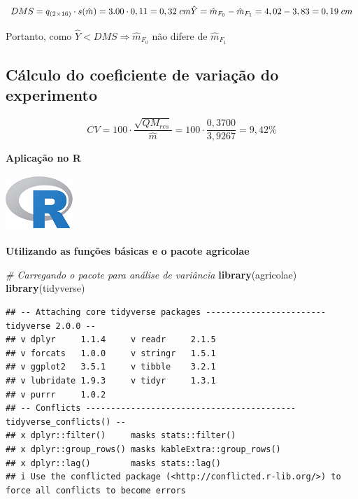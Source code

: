 \documentclass[
]{article}
\newenvironment{Shaded}{\begin{snugshade}}{\end{snugshade}}
\newcommand{\CommentTok}[1]{\textcolor[rgb]{0.56,0.35,0.01}{\textit{#1}}}
\newcommand{\FunctionTok}[1]{\textcolor[rgb]{0.13,0.29,0.53}{\textbf{#1}}}
\newcommand{\NormalTok}[1]{#1}
\begin{document}
\[
DMS=q_{(2\times1 6)}\cdot s(\hat{m})=3.00 \cdot 0,11 = 0,32\; cm \\
\hat{Y}=\hat{m}_{F_0}-\hat{m}_{F_1}=4,02-3,83=0,19 \; cm
\]

Portanto, como \(\hat{Y}< DMS \Rightarrow \hat{m}_{F_0}\) não difere de
\(\hat{m}_{F_1}\)

\subsection{Cálculo do coeficiente de variação do
experimento}\label{cuxe1lculo-do-coeficiente-de-variauxe7uxe3o-do-experimento}

\[
CV=100\cdot \frac{\sqrt{QM_{res}}}{\hat{m}}=100\cdot \frac{0,3700}{3,9267}=9,42\%
\]

\textbf{Aplicação no R}

\includegraphics{R.png}

\textbf{Utilizando as funções básicas e o pacote agricolae}

\begin{Shaded}
\begin{Highlighting}[]
\CommentTok{\# Carregando o pacote para análise de variância}
\FunctionTok{library}\NormalTok{(agricolae)}
\FunctionTok{library}\NormalTok{(tidyverse)}
\end{Highlighting}
\end{Shaded}

\begin{verbatim}
## -- Attaching core tidyverse packages ------------------------ tidyverse 2.0.0 --
## v dplyr     1.1.4     v readr     2.1.5
## v forcats   1.0.0     v stringr   1.5.1
## v ggplot2   3.5.1     v tibble    3.2.1
## v lubridate 1.9.3     v tidyr     1.3.1
## v purrr     1.0.2     
## -- Conflicts ------------------------------------------ tidyverse_conflicts() --
## x dplyr::filter()     masks stats::filter()
## x dplyr::group_rows() masks kableExtra::group_rows()
## x dplyr::lag()        masks stats::lag()
## i Use the conflicted package (<http://conflicted.r-lib.org/>) to force all conflicts to become errors
\end{verbatim}
\end{document}
